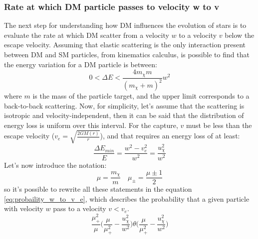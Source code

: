 \subsubsection{Rate at which DM particle passes to velocity w to v}
The next step for understanding how DM influences the evolution of stars is to evaluate the rate at which DM scatter from a velocity $w$ to a velocity $v$ below the escape velocity. 
Assuming that elastic scattering is the only interaction present between DM and SM particles, from kinematics calculus, is possible to find that the energy variation for a DM particle is between:
\begin{equation*}
    0<\Delta E < \frac{4m_{\chi}m}{(m_{\chi}+m)^2}w^2
\end{equation*}
where $m$ is the mass of the particle target, and the upper limit corresponds to a back-to-back scattering. Now, for simplicity, let's assume that the scattering is isotropic and velocity-independent, then it can be said that the distribution of energy loss is uniform over this interval.
For the capture, $v$ must be less than the escape velocity ($v_e=\sqrt{\frac{2GM(r)}{r}}$), and that requires an energy loss of at least:
\begin{equation*}
    \frac{\Delta E_{min}}{E}=\frac{w^2-v_e^2}{w^2}=\frac{u_{\chi}^2}{w^2}
\end{equation*}
 Let's now introduce the notation:
\begin{equation*}
    \mu=\frac{m_{\chi}}{m}\quad \mu_{\pm}=\frac{\mu\pm 1}{2}
\end{equation*}
so it's possible to rewrite all these statements in the equation \ref{eq:probaility_w_to_v_e}, which describes the probability that a given particle with velocity $w$ pass to a velocity $v<v_e$.
\begin{equation}
    \frac{\mu_+^2}{\mu}\big(\frac{\mu}{\mu_+^2}-\frac{u_{\chi}^2}{w^2}\big)\theta\big(\frac{\mu}{\mu_+^2}-\frac{u_{\chi}^2}{w^2}\big)
\end{equation}

